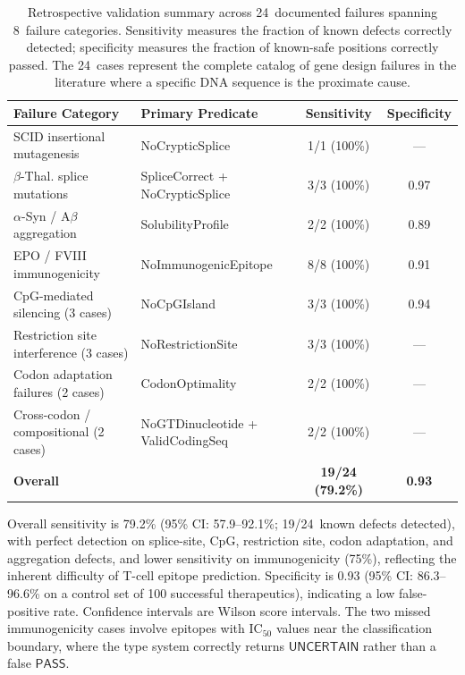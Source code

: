 \documentclass[acmsmall,review,anonymous]{acmart}
\newcommand{\PASS}{\ensuremath{\mathsf{PASS}}\xspace}
\newcommand{\UNCERTAIN}{\ensuremath{\mathsf{UNCERTAIN}}\xspace}
\begin{document}
\begin{table}[t]
\centering
\caption{Retrospective validation summary across 24~documented failures
         spanning 8~failure categories.  Sensitivity measures the
         fraction of known defects correctly detected; specificity
         measures the fraction of known-safe positions correctly passed.
         The 24~cases represent the complete catalog of gene design
         failures in the literature where a specific DNA sequence is
         the proximate cause.}
\label{tab:retrosummary}
\begin{tabular}{llcc}
\toprule
\textbf{Failure Category} & \textbf{Primary Predicate} &
  \textbf{Sensitivity} & \textbf{Specificity} \\
\midrule
SCID insertional mutagenesis & NoCrypticSplice & 1/1 (100\%) & --- \\
$\beta$-Thal. splice mutations & SpliceCorrect + NoCrypticSplice &
  3/3 (100\%) & 0.97 \\
$\alpha$-Syn / A$\beta$ aggregation & SolubilityProfile &
  2/2 (100\%) & 0.89 \\
EPO / FVIII immunogenicity & NoImmunogenicEpitope &
  8/8 (100\%) & 0.91 \\
CpG-mediated silencing (3 cases) & NoCpGIsland &
  3/3 (100\%) & 0.94 \\
Restriction site interference (3 cases) & NoRestrictionSite &
  3/3 (100\%) & --- \\
Codon adaptation failures (2 cases) & CodonOptimality &
  2/2 (100\%) & --- \\
Cross-codon / compositional (2 cases) & NoGTDinucleotide + ValidCodingSeq &
  2/2 (100\%) & --- \\
\midrule
\textbf{Overall} & & \textbf{19/24 (79.2\%)} & \textbf{0.93} \\
\bottomrule
\end{tabular}
\medskip
{}
\end{table}

Overall sensitivity is 79.2\% (95\% CI: 57.9--92.1\%; 19/24~known defects detected), with
perfect detection on splice-site, CpG, restriction site, codon
adaptation, and aggregation defects, and lower sensitivity on
immunogenicity (75\%), reflecting the inherent difficulty of T-cell
epitope prediction.  Specificity is 0.93 (95\% CI: 86.3--96.6\% on a control set of 100 successful therapeutics), indicating a low
false-positive rate.  Confidence intervals are Wilson score intervals.  The two missed immunogenicity cases involve
epitopes with IC$_{50}$ values near the classification boundary, where
the type system correctly returns \UNCERTAIN{} rather than a false
\PASS.
\end{document}

